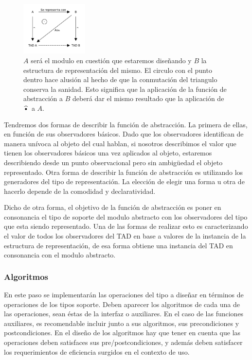 \documentclass[10pt, a4paper]{report}
\begin{document}
\begin{figure}
 \centering
 \includegraphics[width=0.3\textwidth]{FuncionDeAbstraccion.pdf}
 \caption*{\footnotesize $A$ ser\'a el modulo en cuesti\'on que estaremos dise\~nando y $B$ la estructura de representaci\'on del mismo. El circulo con el punto dentro hace alusi\'on al hecho de que la conmutaci\'on del triangulo conserva la sanidad. Esto significa que la aplicaci\'on de la funci\'on de abstracci\'on a $B$ deber\'a dar el mismo resultado que la aplicaci\'on de $\widehat{\text{\textbullet}}$ a $A$.
 \newline 
 \newline }
\end{figure}

Tendremos dos formas de describir la funci\'on de abstracci\'on. La primera de ellas, en funci\'on de sus observadores b\'asicos. Dado que los observadores identifican de manera un\'ivoca al objeto del cual hablan, si nosotros describimos el valor que tienen los observadores b\'asicos una vez aplicados al objeto, estaremos describiendo desde un punto observacional pero sin ambig\"uedad el objeto representado. Otra forma de describir la funci\'on de abstracci\'on es utilizando los generadores del tipo de representaci\'on. La elecci\'on de elegir una forma u otra de hacerlo depende de la comodidad y declaratividad.

Dicho de otra forma, el objetivo de la funci\'on de abstracci\'on es poner en consonancia el tipo de soporte del modulo abstracto con los observadores del tipo que esta siendo representado. Una de las formas de realizar esto es caracterizando el valor de todos los observadores del TAD en base a valores de la instancia de la estructura de representaci\'on, de esa forma obtiene una instancia del TAD en consonancia con el modulo abstracto.

\subsubsection{Algoritmos}

En este paso se implementar\'an las operaciones del tipo a dise\~nar en t\'erminos de operaciones de los tipos soporte. Deben aparecer los algoritmos de cada una de las operaciones, sean \'estas de la interfaz o auxiliares. En el caso de las funciones auxiliares, es recomendable incluir junto a sus algoritmos, sus precondiciones y postcondiciones. En el dise\~no de los algoritmos hay que tener en cuenta que las operaciones deben satisfaces sus pre/postcondiciones, y adem\'as deben satisfacer los requerimientos de eficiencia surgidos en el contexto de uso.
\end{document}

